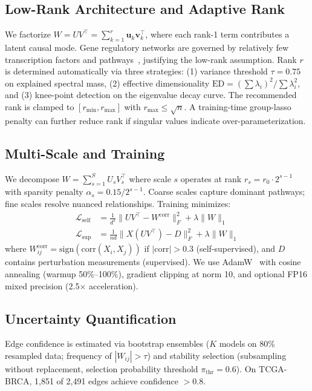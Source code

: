 \documentclass{article}
\theoremstyle{definition}
\begin{document}
\subsection{Low-Rank Architecture and Adaptive Rank}

We factorize $W = U V^\top = \sum_{k=1}^{r} \mathbf{u}_k \mathbf{v}_k^\top$, where each rank-1 term contributes a latent causal mode. Gene regulatory networks are governed by relatively few transcription factors and pathways~\citep{vaquerizas2009census,lambert2018human,hanahan2011hallmarks}, justifying the low-rank assumption. Rank $r$ is determined automatically via three strategies: (1) variance threshold $\tau = 0.75$ on explained spectral mass, (2) effective dimensionality $\mathrm{ED} = (\sum \lambda_i)^2 / \sum \lambda_i^2$, and (3) knee-point detection on the eigenvalue decay curve. The recommended rank is clamped to $[r_{\min}, r_{\max}]$ with $r_{\max} \le \sqrt{n}$. A training-time group-lasso penalty can further reduce rank if singular values indicate over-parameterization.

\subsection{Multi-Scale and Training}

We decompose $W = \sum_{s=1}^{S} U_s V_s^\top$ where scale $s$ operates at rank $r_s = r_0 \cdot 2^{s-1}$ with sparsity penalty $\alpha_s = 0.15 / 2^{s-1}$. Coarse scales capture dominant pathways; fine scales resolve nuanced relationships. Training minimizes:
\begin{align}
    \mathcal{L}_{\text{self}} &= \tfrac{1}{d^2} \| U V^\top - W^{\text{corr}} \|_F^2 + \lambda \|W\|_1 \label{eq:self}\\
    \mathcal{L}_{\text{sup}}  &= \tfrac{1}{n d} \| X (U V^\top) - D \|_F^2 + \lambda \|W\|_1 \label{eq:sup}
\end{align}
where $W^{\text{corr}}_{ij} = \text{sign}(\text{corr}(X_i, X_j))$ if $|\text{corr}| > 0.3$ (self-supervised), and $D$ contains perturbation measurements (supervised). We use AdamW~\citep{kingma2014adam} with cosine annealing (warmup 50\%--100\%), gradient clipping at norm 10, and optional FP16 mixed precision (2.5$\times$ acceleration).

\subsection{Uncertainty Quantification}

Edge confidence is estimated via bootstrap ensembles ($K$ models on 80\% resampled data; frequency of $|W_{ij}| > \tau$) and stability selection (subsampling without replacement, selection probability threshold $\pi_{\text{thr}} = 0.6$). On TCGA-BRCA, 1,851 of 2,491 edges achieve confidence $> 0.8$.
\end{document}

